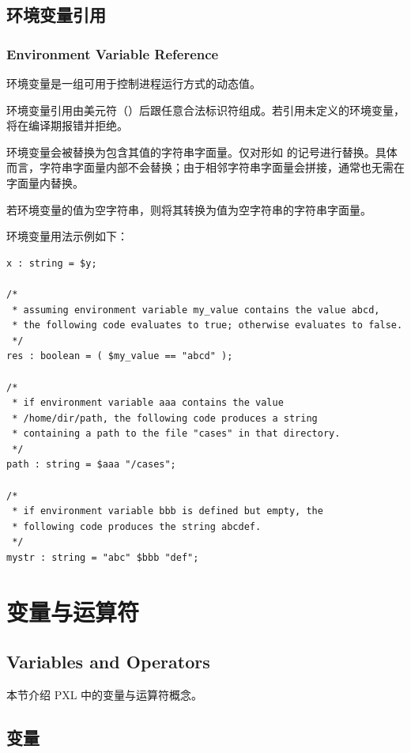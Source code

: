 \subsection{环境变量引用}
\subsubsection*{Environment Variable Reference}

环境变量是一组可用于控制进程运行方式的动态值。

环境变量引用由美元符（\cmd{\$}）后跟任意合法标识符组成。若引用未定义的环境变量，将在编译期报错并拒绝。

环境变量会被替换为包含其值的字符串字面量。仅对形如  的记号进行替换。具体而言，字符串字面量内部不会替换；由于相邻字符串字面量会拼接，通常也无需在字面量内替换。

\begin{noteBox}
若环境变量的值为空字符串，则将其转换为值为空字符串的字符串字面量。
\end{noteBox}

环境变量用法示例如下：
\begin{lstlisting}[style=pxl]
x : string = $y;

/*
 * assuming environment variable my_value contains the value abcd,
 * the following code evaluates to true; otherwise evaluates to false.
 */
res : boolean = ( $my_value == "abcd" );

/*
 * if environment variable aaa contains the value
 * /home/dir/path, the following code produces a string
 * containing a path to the file "cases" in that directory.
 */
path : string = $aaa "/cases";

/*
 * if environment variable bbb is defined but empty, the
 * following code produces the string abcdef.
 */
mystr : string = "abc" $bbb "def";
\end{lstlisting}

\section{变量与运算符}
\subsection*{Variables and Operators}

本节介绍 PXL 中的变量与运算符概念。

\subsection{变量}
